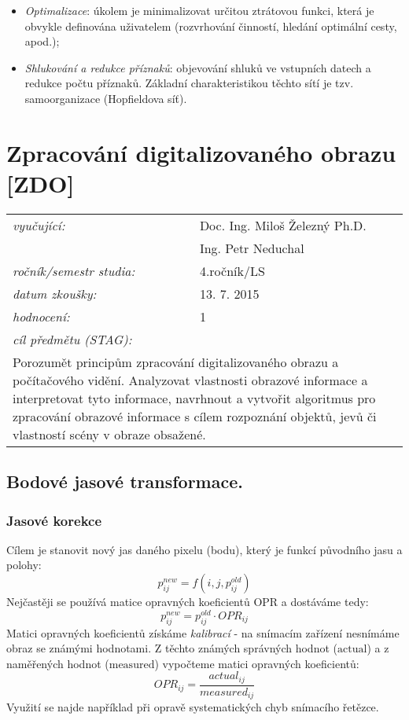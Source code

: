 \begin{itemize}
\item \textit{Optimalizace}: úkolem je minimalizovat určitou ztrátovou funkci, která je obvykle definována uživatelem (rozvrhování činností, hledání optimální cesty, apod.);
\item \textit{Shlukování a redukce příznaků}: objevování shluků ve vstupních datech a redukce počtu příznaků. Základní charakteristikou těchto sítí je tzv. samoorganizace (Hopfieldova síť).
\end{itemize}

\section{Zpracování digitalizovaného obrazu [ZDO]}

\begin{table}[H]
\centering
\begin{tabular}{p{4cm} p{12cm}}
\textit{vyučující:}             & Doc. Ing. Miloš Železný Ph.D. \\
								 & Ing. Petr Neduchal \\
\textit{ročník/semestr studia:} & 4.ročník/LS \\
\textit{datum zkoušky:}         & 13. 7. 2015 \\
\textit{hodnocení:}             & 1 \\
\textit{cíl předmětu (STAG):}   & \\
\multicolumn{2}{p{16cm}}{Porozumět principům zpracování digitalizovaného obrazu a počítačového vidění. Analyzovat vlastnosti obrazové informace a interpretovat tyto informace, navrhnout a vytvořit algoritmus pro zpracování obrazové informace s cílem rozpoznání objektů, jevů či vlastností scény v obraze obsažené.}
\end{tabular}
\end{table}

\subsection{Bodové jasové transformace.}
\subsubsection*{Jasové korekce}
Cílem je stanovit nový jas daného pixelu (bodu), který je funkcí původního jasu a polohy:
\begin{equation}
p^{new}_{ij} = f(i,j,p^{old}_{ij})
\end{equation}
Nejčastěji se používá matice opravných koeficientů $ \mathrm{OPR} $ a dostáváme tedy:
\begin{equation}
p^{new}_{ij} = p^{old}_{ij} \cdot OPR_{ij}
\end{equation}
Matici opravných koeficientů získáme \textit{kalibrací} - na snímacím zařízení nesnímáme obraz se známými hodnotami. Z těchto známých správných hodnot ($ \mathrm{actual} $) a z naměřených hodnot ($ \mathrm{measured} $) vypočteme matici opravných koeficientů:
\begin{equation}
OPR_{ij} = \frac{actual_{ij}}{measured_{ij}}
\end{equation}
Využití se najde například při opravě systematických chyb snímacího řetězce.

